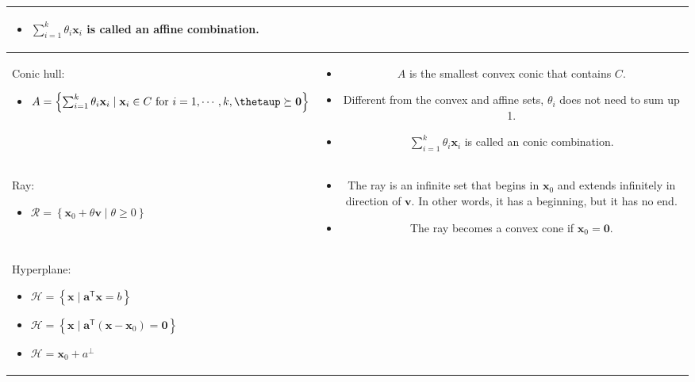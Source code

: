 \documentclass{article}
\newcommand{\trans}{\mathsf{T}}
\begin{document}
\begin{table}[H]
\begin{tabularx}{\textwidth}{|A|C|}
\begin{itemize}[leftmargin=*]
    \item \(\sum_{i=1}^{k} \theta_i\mathbf{x}_i\) is called an affine combination.
\end{itemize}\\
\hline
Conic hull:
\begin{itemize}[leftmargin=*]
    \item $A = \left\{ \sum_{i=1}^{k} \theta_i\mathbf{x}_i \mid \mathbf{x}_i \in C  \textnormal{ for } i=1,\cdots, k, \boldsymbol{\thetaup} \succeq \mathbf{0} \right\}$
\end{itemize} & \vspace{-3.5ex}
\begin{itemize}[leftmargin=*]
    \item $A$ is the smallest convex conic that contains $C$.
    \item Different from the convex and affine sets, \(\theta_i\) does not need to sum up 1.
    \item \(\sum_{i=1}^{k} \theta_i\mathbf{x}_i\) is called an conic combination.
\end{itemize}\\
\hline
Ray:
\begin{itemize}[leftmargin=*]
    \item \(\mathcal{R} = \left\{ \mathbf{x}_0 + \theta \mathbf{v} \mid \theta \geq 0 \right\}\)
\end{itemize} & \vspace{-3.5ex} \begin{itemize}[leftmargin=*]
    \item The ray is an infinite set that begins in \(\mathbf{x}_0\) and extends infinitely in direction of \(\mathbf{v}\). In other words, it has a beginning, but it has no end.
    \item The ray becomes a convex cone if \(\mathbf{x}_0 = \mathbf{0}.\)
\end{itemize} \\
\hline
Hyperplane:
\begin{itemize}[leftmargin=*]
    \item \( \mathcal{H} = \left\{ \mathbf{x} \mid \mathbf{a}^\trans \mathbf{x} = b \right\}\)
    \item \(\mathcal{H} = \left\{ \mathbf{x} \mid \mathbf{a}^\trans (\mathbf{x} - \mathbf{x}_{0}) = \mathbf{0} \right\}\)
    \item \(\mathcal{H} = \mathbf{x}_0 + a^{\perp} \)
\end{itemize} & \vspace{-3.5ex}
\begin{itemize}[leftmargin=*]

\end{itemize}
\end{tabularx}
\end{table}
\end{document}
